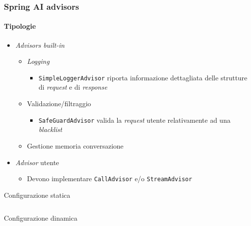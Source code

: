 %
\begin{frame}[t,fragile] \frametitle{Spring AI advisors}
    \framesubtitle{Tipologie}
    \vspace*{-.7cm}
    {\footnotesize
    \begin{itemize}[leftmargin=10pt,align=right]
        \item[\alert{\faArrowCircleRight}] \textit{Advisors built-in}
        \begin{itemize}[leftmargin=10pt,align=right]
            \item[\alert{\faArrowCircleRight}] \textit{Logging}
            \begin{itemize}[leftmargin=10pt,align=right]
                \item[\alert{\faArrowCircleRight}] \alert{\texttt{SimpleLoggerAdvisor}} riporta informazione dettagliata delle strutture di \textit{request} e di \textit{response}
            \end{itemize}
            \item[\alert{\faArrowCircleRight}] Validazione/filtraggio
            \begin{itemize}[leftmargin=10pt,align=right]
                \item[\alert{\faArrowCircleRight}] \alert{\texttt{SafeGuardAdvisor}} valida la \textit{request} utente relativamente ad una \textit{blacklist}
            \end{itemize}
            \item[\alert{\faArrowCircleRight}] Gestione memoria conversazione
        \end{itemize}
        \item[\alert{\faArrowCircleRight}] \textit{Advisor} utente
        \begin{itemize}[leftmargin=10pt,align=right]
            \item[\alert{\faArrowCircleRight}] Devono implementare \texttt{CallAdvisor} \alert{e/o} \texttt{StreamAdvisor}
        \end{itemize}
    \end{itemize}
    \begin{block}{Configurazione statica}
		{\tiny\inputminted{java}{code/DefaultAdvisorsExample.java}}
    \end{block}
    \begin{block}{Configurazione dinamica}
		{\tiny\inputminted{java}{code/AdvisorsExample.java}}
    \end{block}
    }
\end{frame}
